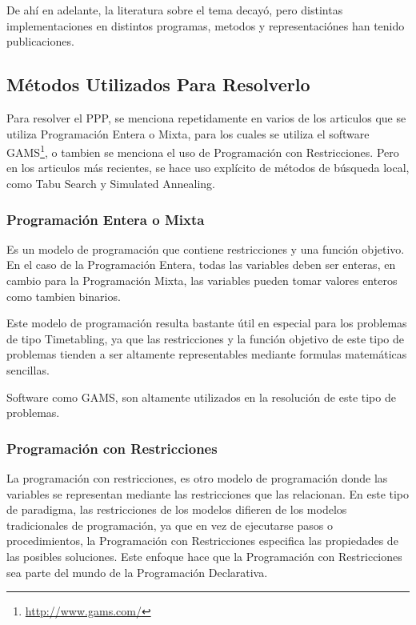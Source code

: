 \documentclass[letter, 10pt]{article}
\begin{document}
De ahí en adelante, la literatura sobre el tema decayó, pero distintas implementaciones en distintos programas, metodos y representaciónes han tenido publicaciones. \cite{CustomizingSearch,ProgressOnThePartyProblem}

\subsection{Métodos Utilizados Para Resolverlo}
Para resolver el PPP, se menciona repetidamente en varios de los articulos que se utiliza Programación Entera o Mixta, para los cuales se utiliza el software GAMS\footnote{\url{http://www.gams.com/}}, o tambien se menciona el uso de Programación con Restricciones\cite{FirstPublication}. Pero en los articulos más recientes, se hace uso explícito de métodos de búsqueda local, como Tabu Search y Simulated Annealing.

\subsubsection{Programación Entera o Mixta}
Es un modelo de programación que contiene restricciones y una función objetivo. En el caso de la Programación Entera, todas las variables deben ser enteras, en cambio para la Programación Mixta, las variables pueden tomar valores enteros como tambien binarios.

Este modelo de programación resulta bastante útil en especial para los problemas de tipo Timetabling, ya que las restricciones y la función objetivo de este tipo de problemas tienden a ser altamente representables mediante formulas matemáticas sencillas.

Software como GAMS, son altamente utilizados en la resolución de este tipo de problemas.

\subsubsection{Programación con Restricciones}
La programación con restricciones, es otro modelo de programación donde las variables se representan mediante las restricciones que las relacionan. En este tipo de paradigma, las restricciones de los modelos difieren de los modelos tradicionales de programación, ya que en vez de ejecutarse pasos o procedimientos, la Programación con Restricciones especifica las propiedades de las posibles soluciones. Este enfoque hace que la Programación con Restricciones sea parte del mundo de la Programación Declarativa.
\end{document}
